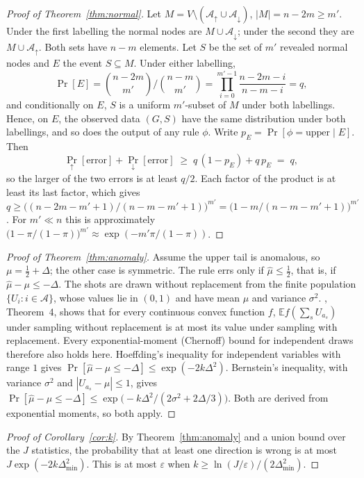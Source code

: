 \documentclass[pdflatex,sn-mathphys-ay]{sn-jnl}
\theoremstyle{plain}
\theoremstyle{remark}
\begin{document}
\begin{appendices}
\begin{proof}[Proof of Theorem~\ref{thm:normal}]
Let $M = V \setminus (\mathcal{A}_\uparrow \cup \mathcal{A}_\downarrow)$, $|M| = n - 2m \ge m'$. Under the first labelling the normal nodes are $M \cup \mathcal{A}_\downarrow$; under the second they are $M \cup \mathcal{A}_\uparrow$. Both sets have $n - m$ elements. Let $S$ be the set of $m'$ revealed normal nodes and $E$ the event $S \subseteq M$. Under either labelling,
\[
\Pr[E] = \binom{n-2m}{m'}\Big/\binom{n-m}{m'} = \prod_{i=0}^{m'-1}\frac{n-2m-i}{n-m-i} = q,
\]
and conditionally on $E$, $S$ is a uniform $m'$-subset of $M$ under both labellings. Hence, on $E$, the observed data $(G, S)$ have the same distribution under both labellings, and so does the output of any rule $\phi$. Write $p_E = \Pr[\phi = \text{upper} \mid E]$. Then
\[
\Pr_{\uparrow}[\text{error}] + \Pr_{\downarrow}[\text{error}]
\;\ge\; q\,(1 - p_E) + q\,p_E \;=\; q,
\]
so the larger of the two errors is at least $q/2$. Each factor of the product is at least its last factor, which gives $q \ge \big((n-2m-m'+1)/(n-m-m'+1)\big)^{m'} = \big(1 - m/(n-m-m'+1)\big)^{m'}$. For $m' \ll n$ this is approximately $\big(1-\pi/(1-\pi)\big)^{m'} \approx \exp(-m'\pi/(1-\pi))$.
\end{proof}

\begin{proof}[Proof of Theorem~\ref{thm:anomaly}]
Assume the upper tail is anomalous, so $\mu = \tfrac12 + \Delta$; the other case is symmetric. The rule errs only if $\hat\mu \le \tfrac12$, that is, if $\hat\mu - \mu \le -\Delta$. The shots are drawn without replacement from the finite population $\{U_i : i \in \mathcal{A}\}$, whose values lie in $(0,1)$ and have mean $\mu$ and variance $\sigma^2$. \citet{hoeffding1963probability}, Theorem~4, shows that for every continuous convex function $f$, $\mathbb{E} f(\sum_s U_{a_s})$ under sampling without replacement is at most its value under sampling with replacement. Every exponential-moment (Chernoff) bound for independent draws therefore also holds here. Hoeffding's inequality for independent variables with range $1$ gives $\Pr[\hat\mu - \mu \le -\Delta] \le \exp(-2k\Delta^2)$. Bernstein's inequality, with variance $\sigma^2$ and $|U_{a_s} - \mu| \le 1$, gives $\Pr[\hat\mu - \mu \le -\Delta] \le \exp\!\big(-k\Delta^2 / (2\sigma^2 + 2\Delta/3)\big)$. Both are derived from exponential moments, so both apply.
\end{proof}

\begin{proof}[Proof of Corollary~\ref{cor:k}]
By Theorem~\ref{thm:anomaly} and a union bound over the $J$ statistics, the probability that at least one direction is wrong is at most $J\exp(-2k\Delta_{\min}^2)$. This is at most $\varepsilon$ when $k \ge \ln(J/\varepsilon)/(2\Delta_{\min}^2)$.
\end{proof}


\end{appendices}
\end{document}

